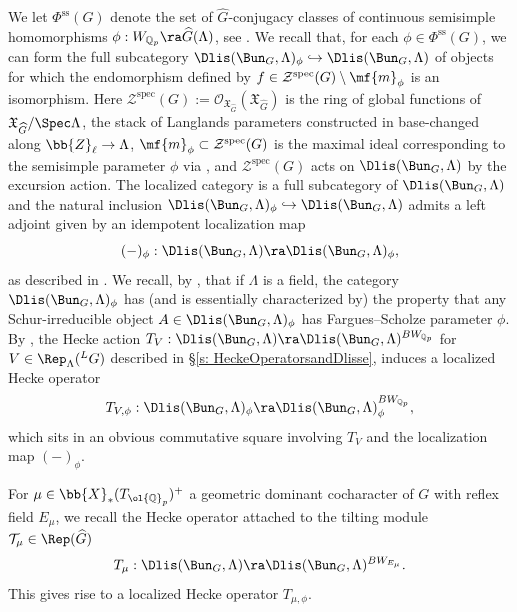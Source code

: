 \documentclass[letterpaper,11pt]{amsart}
\begin{document}
We let $\Phi^{\mathrm{ss}}(G)$ denote the set of $\widehat{G}$-conjugacy classes of continuous semisimple homomorphisms $\phi: W_{\mathbb{Q}_{p}} \ra \widehat{G}(\Lambda)$, see \cite[Definition VIII.3.1]{FSGeomLLC}. We recall \cite[Appendix~A]{HamannLeeTorsion} that, for each $\phi \in \Phi^{\mathrm{ss}}(G)$, we can form the full subcategory $\Dlis(\Bun_{G},\Lambda)_{\phi} \hookrightarrow \Dlis(\Bun_{G},\Lambda)$ of objects for which the endomorphism defined by $f \in \mathcal{Z}^{\mathrm{spec}}(G) \setminus \mf{m}_{\phi}$ is an isomorphism. Here $\mathcal{Z}^{\mathrm{spec}}(G) := \mathcal{O}_{\mathfrak{X}_{\widehat{G}}}(\mathfrak{X}_{\widehat{G}})$ is the ring of global functions of $\mathfrak{X}_{\widehat{G}}/\Spec \Lambda$, the stack of Langlands parameters constructed in \cite[Section~VII.1]{FSGeomLLC} base-changed along $\bb{Z}_\ell\to\Lambda$, $\mf{m}_{\phi} \subset\mathcal{Z}^\mathrm{spec}(G)$ is the maximal ideal corresponding to the semisimple parameter $\phi$ via \cite[Proposition~VIII.3.2]{FSGeomLLC}, and $\mathcal{Z}^\mathrm{spec}(G)$ acts on $\Dlis(\Bun_{G},\Lambda)$ by the excursion action. The localized category is a full subcategory of $\Dlis(\Bun_{G},\Lambda)$ and the natural inclusion $\Dlis(\Bun_{G},\Lambda)_{\phi} \hookrightarrow \Dlis(\Bun_{G},\Lambda)$ admits a left adjoint given by an idempotent localization map
\[ (-)_{\phi}:  \Dlis(\Bun_{G},\Lambda) \ra \Dlis(\Bun_{G},\Lambda)_{\phi}, \]
as described in \cite[Appendix~A]{HamannLeeTorsion}. We recall, by \cite[Lemma~4.2 (1)]{HamannLeeTorsion}, that if $\Lambda$ is a field, the category $\Dlis(\Bun_{G},\Lambda)_{\phi}$ has (and is essentially characterized by) the property that any Schur-irreducible object $A \in \Dlis(\Bun_{G},\Lambda)_{\phi}$  has Fargues--Scholze parameter $\phi$. By \cite[Lemma~4.2]{HamannLeeTorsion}, the Hecke action $T_{V}: \Dlis(\Bun_{G},\Lambda) \ra \Dlis(\Bun_{G},\Lambda)^{BW_{\mathbb{Q}_{p}}}$ for $V \in \Rep_{\Lambda}(\phantom{}^{L}G)$ described in \S \ref{s: HeckeOperatorsandDlisse}, induces a localized Hecke operator
\begin{equation}{\label{eqn: LocalizedHeckeOperator}}
 T_{V,\phi}: \Dlis(\Bun_{G},\Lambda)_{\phi} \ra \Dlis(\Bun_{G},\Lambda)^{BW_{\mathbb{Q}_{p}}}_{\phi}, 
\end{equation}
which sits in an obvious commutative square involving $T_{V}$ and the localization map $(-)_{\phi}$.

For $\mu \in \bb{X}_{*}(T_{\ol{\mathbb{Q}}_{p}})^{+}$ a geometric dominant cocharacter of $G$ with reflex field $E_{\mu}$, we recall the Hecke operator attached to the tilting module $\mathcal{T}_{\mu} \in \Rep(\widehat{G})$
\[ T_{\mu}: \Dlis(\Bun_{G},\Lambda) \ra \Dlis(\Bun_{G},\Lambda)^{BW_{E_{\mu}}}.\]
This gives rise to a localized Hecke operator $T_{\mu,\phi}$.
\end{document}
